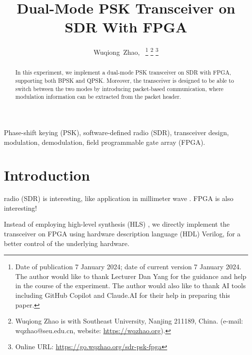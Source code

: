 \documentclass[journal,twoside]{IEEEtran}
\newcommand\orcidicon[1]{\href{https://orcid.org/#1}{\mbox{\scalerel*{
  \begin{tikzpicture}[yscale=-1,transform shape]
    \pic{orcidlogo};
  \end{tikzpicture}
}{|}}}}
\begin{document}
  \title{Dual-Mode PSK Transceiver on SDR With FPGA}

  \author{%
    Wuqiong~Zhao{\hspace{.1em}\textsuperscript{\orcidicon{0000-0002-9550-7423}}},~
    \thanks{Date of publication 7 January 2024; date of current version 7 January 2024.
      The author would like to thank Lecturer Dan Yang for the guidance and help in the course of the experiment.
      The author would also like to thank AI tools including GitHub Copilot and Claude.AI for their help in preparing this paper.}
    \thanks{Wuqiong Zhao is with Southeast University, Nanjing 211189, China. (e-mail: wqzhao@seu.edu.cn, website: \url{https://wqzhao.org}).}
    \thanks{Online URL: \url{https://go.wqzhao.org/sdr-psk-fpga}}
  }


  \maketitle

  \begin{abstract}
    In this experiment, we implement a dual-mode PSK transceiver on SDR with FPGA,
    supporting both BPSK and QPSK.
    Moreover, the transceiver is designed to be able to switch between the two modes by introducing packet-based communication,
    where modulation information can be extracted from the packet header.
  \end{abstract}
  \begin{IEEEkeywords}
    Phase-shift keying (PSK), software-defined radio (SDR), transceiver design, modulation, demodulation, field programmable gate array (FPGA).
  \end{IEEEkeywords}

  \section{Introduction}

     radio (SDR) is interesting, like application in millimeter wave \cite{zhao2020m}.
    FPGA is also interesting!

    Instead of employing high-level synthesis (HLS) \cite{zhao2023flexible},
    we directly implement the transceiver on FPGA using hardware description language (HDL) Verilog,
    for a better control of the underlying hardware.
\end{document}
